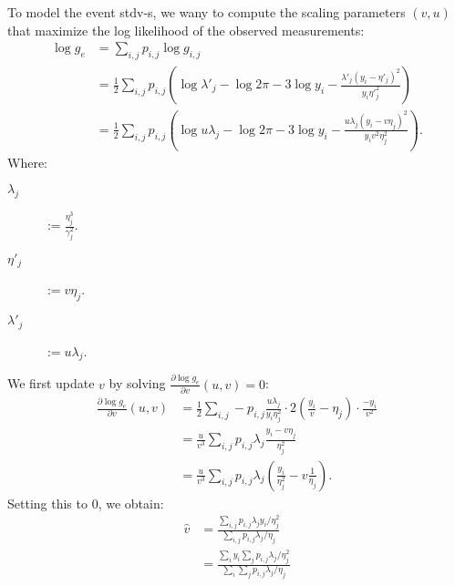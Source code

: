 \documentclass{article}
\begin{document}
To model the event stdv-s, we wany to compute the scaling parameters $(v,u)$ that maximize the log likelihood of the observed measurements:
\begin{align*}
\log g_e & = \sum_{i,j} p_{i,j} \log g_{i,j}
\\
& = \frac{1}{2} \sum_{i,j} p_{i,j} \left( \log \lambda'_j - \log 2 \pi - 3 \log y_i
- \frac{\lambda'_j (y_i - \eta'_j)^2}{y_i \eta'^2_j } \right)
\\
& = \frac{1}{2} \sum_{i,j} p_{i,j} \left( \log u \lambda_j - \log 2 \pi - 3 \log y_i
- \frac{u \lambda_j (y_i - v \eta_j)^2}{y_i v^2 \eta^2_j} \right).
\end{align*}
Where:
\begin{description}
\item[$\lambda_j$] $:= \frac{\eta^3_j}{\gamma^2_j}$.
\item[$\eta'_j$] $:= v \eta_j$.
\item[$\lambda'_j$] $:= u \lambda_j$.
\end{description}

We first update $v$ by solving $\frac{\partial \log g_e}{\partial v} (u, v) = 0$:
\begin{align*}
\frac{\partial \log g_e}{\partial v} (u, v) & = \frac{1}{2} \sum_{i,j} - p_{i,j} \frac{u \lambda_j}{y_i \eta^2_j} \cdot 2 \left( \frac{y_i}{v} - \eta_j \right) \cdot \frac{-y_i}{v^2}
\\
& = \frac{u}{v^3} \sum_{i,j} p_{i,j} \lambda_j \frac{y_i - v \eta_j}{\eta^2_j}
\\
& = \frac{u}{v^3} \sum_{i,j} p_{i,j} \lambda_j \left(\frac{y_i}{\eta^2_j} - v \frac{1}{\eta_j} \right).
\end{align*}
Setting this to 0, we obtain:
\begin{align*}
\hat{v} & = \frac{\sum_{i,j} p_{i,j} \lambda_j y_i / \eta^2_j}{\sum_{i,j} p_{i,j} \lambda_j / \eta_j}
\\
& = \frac{ \sum_i y_i \sum_j p_{i,j} \lambda_j / \eta^2_j }{ \sum_i \sum_j p_{i,j} \lambda_j / \eta_j }
\end{align*}
\end{document}

